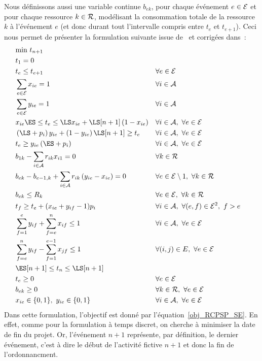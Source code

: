 Nous définissons aussi une variable continue $b_{ek}$, pour chaque
événement $e \in {\cal E}$ et pour chaque ressource $k \in {\cal R}$, modélisant
la consommation totale de la ressource $k$ à l'événement $e$ (et
donc durant tout l'intervalle compris entre $t_e$ et $t_{e+1}$).
Ceci nous permet de présenter la formulation
suivante issue de~\cite{modele_RCPSP} et corrigées dans~\cite{ABKKLM}: 
{\small
\begin{align} 
& \text{min } t_{n+1}
\label{obj_RCPSP_SE}\\ 
& t_1 =0 & & \label{t0_RCPSP_SE}\\ 
&t_e \le
t_{e+1} & & \forall e \in {\cal E} \label{ordre_RCPSP_SE}\\
&\sum_{e\in {\cal E}} x_{ie} =1 & & \forall i \in \A
\label{start_RCPSP_SE}\\ 
&\sum_{e\in {\cal E}} y_{ie} =1 & &
\forall i \in \A\label{end_RCPSP_SE}\\ 
&x_{ie}\ES \le t_e \le \LS
x_{ie}+\LS[n+1]\left(1-x_{ie}\right) & & \forall i \in \A,\ \forall
e \in {\cal E} \label{twx_RCPSP_SE}\\ 
&\left(\LS+p_i\right)y_{ie}
+\left(1-y_{ie}\right)\LS[n+1] \ge t_e & & \forall i \in \A ,\
\forall e \in {\cal E} \label{twy1_RCPSP_SE}\\ 
& t_e \ge
y_{ie}\left(\ES+p_i\right) & & \forall i \in \A ,\ \forall e \in
{\cal E} \label{twy2_RCPSP_SE}\\ 
&b_{1k} - \sum_{i \in \A}
r_{ik}x_{i1}=0 & & \forall k \in {\cal R} \label{res0_RCPSP_SE}\\
& b_{ek} - b_{e-1,k} + \sum_{i\in \A}r_{ik}
\left(y_{ie}-x_{ie}\right)=0 & & \forall e \in {\cal E}
\setminus{1},\ \forall k \in {\cal R} \label{resCons_RCPSP_SE}\\ 
&
b_{ek} \le R_k & & \forall e \in {\cal E},\ \forall k\in {\cal R}
\label{res_RCPSP_SE}\\
 &t_f \ge t_e + (x_{ie} + y_{if} -1) p_i & &
\forall i \in \A,\ \forall (e,f) \in {\cal E}^2,\ f>e
\label{dur_RCPSP_SE}\\ 
&\sum_{f=1}^e y_{if} +\sum_{f=e}^n x_{if}
\le 1 & & \forall i \in \A,\ \forall e \in {\cal E}
\label{xby_RCPSP_SE}\\
 &\sum_{f=e}^n y_{if} - \sum_{f=1}^{e-1}
x_{jf} \le 1 & & \forall (i,j) \in E,\ \forall e \in {\cal E}
\label{prec_RCPSP_SE}\\ 
& \ES[n+1] \le t_n \le \LS[n+1]&
&\label{Btn_RCPSP_SE}\\ 
&t_e \ge 0 & & \forall e \in {\cal E}
\label{Bte_RCPSP_SE}\\ 
& b_{ek} \ge 0 & & \forall k \in {\cal R},\
\forall e \in {\cal E} \label{Bbek_RCPSP_SE}\\ 
&x_{ie} \in
\{0,1\},\ y_{ie} \in \{0,1\} & & \forall i \in \A,\ \forall e \in
{\cal E} \label{Bxy_RCPSP_SE} \end{align}
 }
Dans cette formulation, l'objectif est donné par
l'équation~\eqref{obj_RCPSP_SE}. En effet, comme pour la
formulation à temps discret, on cherche à minimiser la date de fin
du projet. Or, l'événement $n+1$ représente, par définition, le
dernier événement, c'est à dire le début de l'activité fictive $n+1$
et donc la fin de l'ordonnancment.

